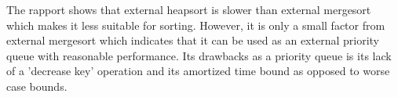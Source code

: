 The rapport shows that external heapsort is slower than external mergesort which makes it less suitable for sorting. 
However, it is only a small factor from external mergesort which indicates that it can be used as an external priority queue with reasonable performance. Its drawbacks as a priority queue is its lack of a 'decrease key' operation and its amortized time bound as opposed to worse case bounds.
